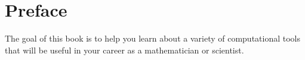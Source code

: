 \chapter*{Preface}

The goal of this book is to help you learn about a variety of 
computational tools that will be useful in your career as a mathematician
or scientist.
